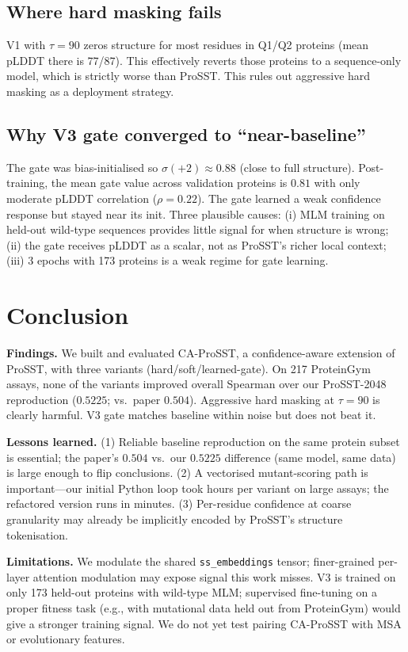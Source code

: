 \documentclass[11pt,a4paper]{article}
\begin{document}
\subsection{Where hard masking fails}
V1 with $\tau{=}90$ zeros structure for most residues in Q1/Q2 proteins
(mean pLDDT there is 77/87). This effectively reverts those proteins to
a sequence-only model, which is strictly worse than ProSST. This rules
out aggressive hard masking as a deployment strategy.

\subsection{Why V3 gate converged to ``near-baseline''}
The gate was bias-initialised so $\sigma(+2){\approx}0.88$ (close to full
structure). Post-training, the mean gate value across validation proteins
is $0.81$ with only moderate pLDDT correlation ($\rho{=}0.22$). The gate
learned a weak confidence response but stayed near its init. Three plausible
causes: (i) MLM training on held-out wild-type sequences provides little
signal for when structure is wrong; (ii) the gate receives pLDDT as a
scalar, not as ProSST's richer local context; (iii) 3 epochs with 173
proteins is a weak regime for gate learning.

\section{Conclusion}

\textbf{Findings.} We built and evaluated CA-ProSST, a confidence-aware
extension of ProSST, with three variants (hard/soft/learned-gate).
On 217 ProteinGym assays, none of the variants improved overall Spearman
over our ProSST-2048 reproduction ($0.5225$; vs.\ paper $0.504$). Aggressive
hard masking at $\tau{=}90$ is clearly harmful. V3 gate matches baseline
within noise but does not beat it.

\textbf{Lessons learned.} (1) Reliable baseline reproduction on the same
protein subset is essential; the paper's $0.504$ vs.\ our $0.5225$
difference (same model, same data) is large enough to flip conclusions.
(2) A vectorised mutant-scoring path is important---our initial Python loop
took hours per variant on large assays; the refactored version runs in
minutes. (3) Per-residue confidence at coarse granularity may already be
implicitly encoded by ProSST's structure tokenisation.

\textbf{Limitations.} We modulate the shared \texttt{ss\_embeddings}
tensor; finer-grained per-layer attention modulation may expose signal
this work misses. V3 is trained on only 173 held-out proteins with
wild-type MLM; supervised fine-tuning on a proper fitness task (e.g.,
with mutational data held out from ProteinGym) would give a stronger
training signal. We do not yet test pairing CA-ProSST with MSA or
evolutionary features.
\end{document}
